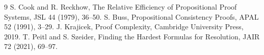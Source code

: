 \documentclass[11pt]{article}
\begin{document}
\begin{thebibliography}{9}
 S. Cook and R. Reckhow, The Relative Efficiency of Propositional Proof Systems, JSL 44 (1979), 36--50.
 S. Buss, Propositional Consistency Proofs, APAL 52 (1991), 3--29.
 J. Krajicek, Proof Complexity, Cambridge University Press, 2019.
 T. Peitl and S. Szeider, Finding the Hardest Formulas for Resolution, JAIR 72 (2021), 69--97.
\end{thebibliography}
\end{document}

